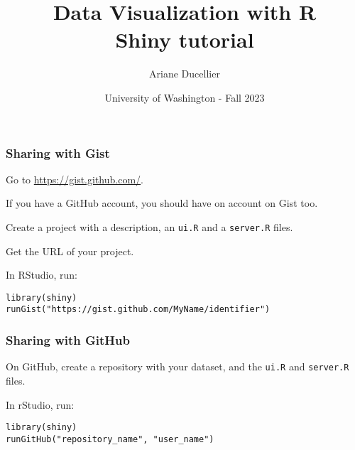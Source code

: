 \documentclass{beamer}
\title[Data Visualization with R - Shiny tutorial]{Data Visualization with R \\ Shiny tutorial}
\author{Ariane Ducellier}
\date{University of Washington - Fall 2023}
\begin{document}
	\begin{frame}
		\titlepage
	\end{frame}

	\begin{frame}[fragile]
		\frametitle{Sharing with Gist}

		Go to \href{https://gist.github.com/}{https://gist.github.com/}.

		\vspace{1em}

		If you have a GitHub account, you should have on account on Gist too.

		\vspace{1em}

		Create a project with a description, an \verb|ui.R| and a \verb|server.R| files.

		\vspace{1em}

		Get the URL of your project.

		\vspace{1em}

		In RStudio, run:
		
		\begin{exampleblock}{}
		\begin{BVerbatim}
library(shiny)
runGist("https://gist.github.com/MyName/identifier")
		\end{BVerbatim}
		\end{exampleblock}{}

	\end{frame}

	\begin{frame}[fragile]
		\frametitle{Sharing with GitHub}

		On GitHub, create a repository with your dataset, and the \verb|ui.R| and \verb|server.R| files.

		\vspace{1em}

		In rStudio, run:
		
		\begin{exampleblock}{}
		\begin{BVerbatim}
library(shiny)
runGitHub("repository_name", "user_name")
		\end{BVerbatim}
		\end{exampleblock}{}

	\end{frame}
\end{document}
